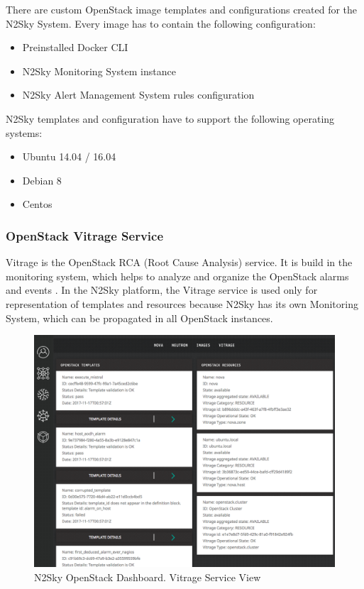 There are custom OpenStack image templates and configurations created for the N2Sky System. Every image has to contain the following configuration:
\begin{itemize}
\item Preinstalled Docker CLI
\item N2Sky Monitoring System instance
\item N2Sky Alert Management System rules configuration
\end{itemize}

N2Sky templates and configuration have to support the following operating systems:
\begin{itemize}
\item Ubuntu 14.04 / 16.04 
\item Debian 8
\item Centos
\end{itemize}



\subsubsection{OpenStack Vitrage Service}\label{OpenStack Vitrage Service}

Vitrage is the OpenStack RCA (Root Cause Analysis) service. It is build in the monitoring system, which helps to analyze and organize the OpenStack alarms and events \cite{wiki:vitrage}. In the N2Sky platform, the Vitrage service is used only for representation of templates and resources because N2Sky has its own Monitoring System, which can be propagated in all OpenStack instances.  

\begin{figure}[H]
\begin{center}
  \includegraphics[width=\linewidth]{components/4/pics/opentack_vitrage.png}
  \caption{N2Sky OpenStack Dashboard. Vitrage Service View}
  \label{fig:opentack_vitrage}
\end{center}
\end{figure}

